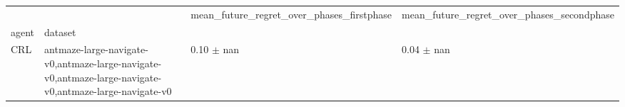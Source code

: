 \begin{tabular}{llll}
\toprule
 &  & mean_future_regret_over_phases_firstphase & mean_future_regret_over_phases_secondphase \\
agent & dataset &  &  \\
\midrule
CRL & antmaze-large-navigate-v0,antmaze-large-navigate-v0,antmaze-large-navigate-v0,antmaze-large-navigate-v0 & 0.10 $\pm$ nan & 0.04 $\pm$ nan \\
\cline{1-4}
\bottomrule
\end{tabular}
